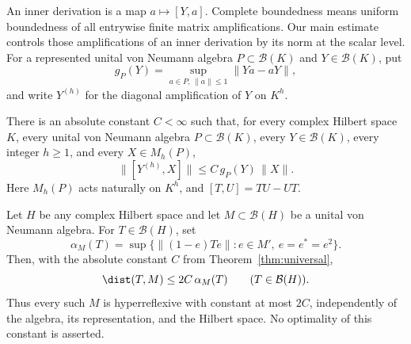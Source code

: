 An inner derivation is a map $a\mapsto[Y,a]$. Complete boundedness
means uniform boundedness of all entrywise finite matrix amplifications.
Our main estimate controls those amplifications of an inner derivation
by its norm at the scalar level.  For a represented unital
von Neumann algebra \(P\subset\mathcal B(K)\) and
\(Y\in\mathcal B(K)\), put
\[
  g_P(Y)=\sup_{a\in P,\,\|a\|\le1}\|Ya-aY\|,
\]
and write \(Y^{(h)}\) for the diagonal amplification of \(Y\) on
\(K^h\).

\begin{theorem}\label{thm:universal}
There is an absolute constant \(C<\infty\) such that, for every complex
Hilbert space \(K\), every unital von Neumann algebra
\(P\subset\mathcal B(K)\), every \(Y\in\mathcal B(K)\), every integer
\(h\ge1\), and every \(X\in M_h(P)\),
\begin{equation}\label{eq:universal}
  \|[Y^{(h)},X]\|\le C\,g_P(Y)\,\|X\|.
\end{equation}
Here \(M_h(P)\) acts naturally on \(K^h\), and \([T,U]=TU-UT\).
\end{theorem}

\begin{corollary}\label{cor:hyperreflexivity}
Let \(H\) be any complex Hilbert space and let
\(M\subset\mathcal B(H)\) be a unital von Neumann algebra. For
\(T\in\mathcal B(H)\), set
\[
 \alpha_M(T)=\sup\{\|(1-e)Te\|:e\in M',\ e=e^*=e^2\}.
\]
Then, with the absolute constant \(C\) from Theorem~\ref{thm:universal},
\begin{equation}\label{eq:universal-hyperreflexivity}
 \dist(T,M)\le 2C\,\alpha_M(T)\qquad(T\in\mathcal B(H)).
\end{equation}
Thus every such \(M\) is hyperreflexive with constant at most \(2C\),
independently of the algebra, its representation, and the Hilbert space.
No optimality of this constant is asserted.
\end{corollary}
